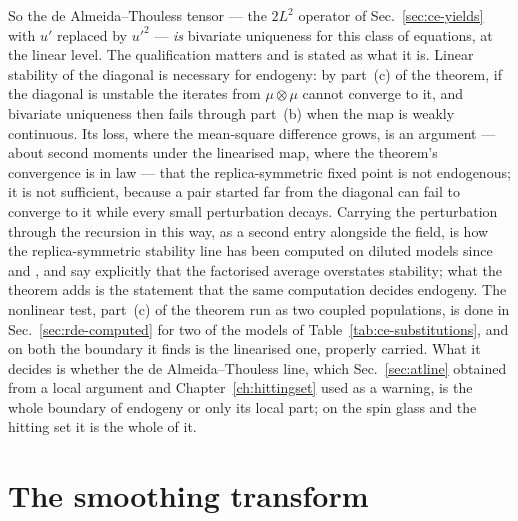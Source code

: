 So the de Almeida--Thouless tensor --- the $2L^{2}$ operator of
Sec.~\ref{sec:ce-yields} with $u'$ replaced by $u'^{2}$ --- \emph{is}
bivariate uniqueness for this class of equations, at the linear level. The
qualification matters and is stated as what it is. Linear stability of the
diagonal is necessary for endogeny: by part~(c) of the theorem, if the
diagonal is unstable the iterates from $\mu\otimes\mu$ cannot converge
to it, and bivariate uniqueness then fails through part~(b) when the map
is weakly continuous. Its loss, where the mean-square difference grows, is
an argument --- about second moments under the linearised map, where the
theorem's convergence is in law --- that the replica-symmetric fixed point
is not endogenous; it is not sufficient, because a pair started far from
the diagonal can fail to converge to it while every small perturbation
decays. Carrying the perturbation through the recursion in this way, as a
second entry alongside the field, is how the replica-symmetric stability
line has been computed on diluted models since \citet{montanari2003} and
\citet{rivoire2004}, and \citet{zdeborova2007} say explicitly that the
factorised average overstates stability; what the theorem adds is the
statement that the same computation decides endogeny. The nonlinear test, part~(c) of
the theorem run as two coupled populations, is done in
Sec.~\ref{sec:rde-computed} for two of the models of
Table~\ref{tab:ce-substitutions}, and on both the boundary it finds is the
linearised one, properly carried. What it decides is whether the de Almeida--Thouless line, which
Sec.~\ref{sec:atline} obtained from a local argument and
Chapter~\ref{ch:hittingset} used as a warning, is the whole boundary of
endogeny or only its local part; on the spin glass and the hitting set it
is the whole of it.

\section{The smoothing transform}
\label{sec:rde-smoothing}

